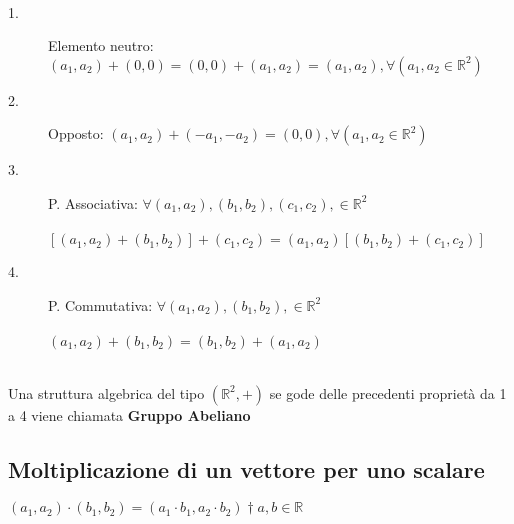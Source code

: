 \begin{nota}
  \phantom{}\\
  \begin{description}
    \item[1.] Elemento neutro: $(a_{1}, a_{2})+(0,0)=(0,0)+(a_{1},
      a_{2})=(a_{1}, a_{2}), \forall(a_{1}, a_{2}\in \mathbb{R}^{2})$
    \item[2.] Opposto: $(a_{1}, a_{2})+(-a_{1}, -a_{2})=(0, 0),
      \forall(a_{1}, a_{2}\in \mathbb{R}^{2})$\\
    \item[3.] P. Associativa: $\forall (a_{1}, a_{2}), (b_{1},
      b_{2}), (c_{1}, c_{2}), \in \mathbb{R}^{2}$\\\\
      \phantom{texttexttextt}$[(a_{1}, a_{2})+(b_{1}, b_{2})]+(c_{1},
      c_{2})=(a_{1}, a_{2})[(b_{1}, b_{2})+(c_{1}, c_{2})]$\\
    \item[4.] P. Commutativa: $\forall (a_{1}, a_{2}), (b_{1},
      b_{2}), \in \mathbb{R}^{2}$\\\\
      \phantom{texttexttexttex}$(a_{1}, a_{2})+(b_{1}, b_{2})=(b_{1},
      b_{2})+(a_{1}, a_{2})$
  \end{description}
\end{nota}
\leavevmode\\
Una struttura algebrica del tipo $(\mathbb{R}^{2},+)$ se gode delle
precedenti proprietà da 1 a 4 viene chiamata \textbf{Gruppo Abeliano}

\newpage

\subsection{Moltiplicazione di un vettore per uno scalare}

\begin{definizione}
  $(a_{1}, a_{2})\cdot(b_{1},b_{2})=(a_{1}\cdot b_{1}, a_{2}\cdot
  b_{2})\dagger a,b\in \mathbb{R}$
\end{definizione}

